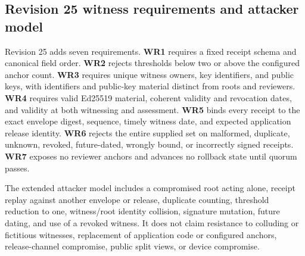 

\subsection{Revision 25 witness requirements and attacker model}

Revision 25 adds seven requirements. \textbf{WR1} requires a fixed receipt schema and canonical field order. \textbf{WR2} rejects thresholds below two or above the configured anchor count. \textbf{WR3} requires unique witness owners, key identifiers, and public keys, with identifiers and public-key material distinct from roots and reviewers. \textbf{WR4} requires valid Ed25519 material, coherent validity and revocation dates, and validity at both witnessing and assessment. \textbf{WR5} binds every receipt to the exact envelope digest, sequence, timely witness date, and expected application release identity. \textbf{WR6} rejects the entire supplied set on malformed, duplicate, unknown, revoked, future-dated, wrongly bound, or incorrectly signed receipts. \textbf{WR7} exposes no reviewer anchors and advances no rollback state until quorum passes.

The extended attacker model includes a compromised root acting alone, receipt replay against another envelope or release, duplicate counting, threshold reduction to one, witness/root identity collision, signature mutation, future dating, and use of a revoked witness. It does not claim resistance to colluding or fictitious witnesses, replacement of application code or configured anchors, release-channel compromise, public split views, or device compromise.
